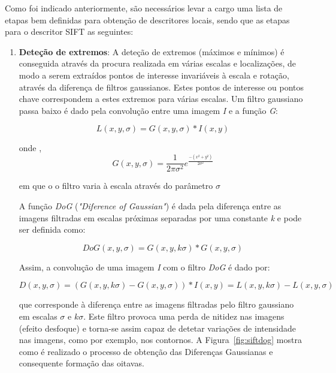 Como foi indicado anteriormente, são necessários levar a cargo uma lista de etapas bem definidas para obtenção de descritores locais, sendo que as etapas para o descritor SIFT as seguintes:

\begin{enumerate}
\item \textbf{Deteção de extremos}:  A deteção de extremos (máximos e mínimos) é conseguida através da procura realizada em várias escalas e localizações, de modo a serem extraídos pontos de interesse invariáveis à escala e rotação, através da diferença de filtros gaussianos. Estes pontos de interesse ou pontos chave correspondem a estes extremos para várias escalas. 
Um filtro gaussiano passa baixo é dado pela convolução entre uma imagem \textit{I} e a função \textit{G}:

\begin{equation}
L\left ( x, y, \sigma  \right ) = G\left ( x, y, \sigma  \right ) * I\left ( x, y \right )
\end{equation}

onde ,
\begin{equation}
G\left ( x, y, \sigma  \right ) = \frac{1}{2\pi \sigma^2} e^\frac{-\left ( x^2 + y^2 \right )}{2\sigma^2} 
\end{equation}

em que o o filtro varia à escala através do parâmetro $ \sigma $

A função \textit{DoG} (\textit{"Diference of Gaussian"}) é dada pela diferença entre as imagens filtradas em escalas próximas separadas por uma constante \textit{k} e pode ser definida como:

\begin{equation}
DoG\left ( x, y, \sigma  \right ) = G\left ( x, y, k\sigma  \right ) * G\left ( x, y, \sigma \right )
\end{equation}

Assim, a convolução de uma imagem \textit{I} com o filtro \textit{DoG} é dado por:

\begin{equation}
D\left ( x, y, \sigma  \right ) = \left (  G\left ( x, y, k\sigma  \right ) - G\left ( x, y, \sigma \right ) \right )* I\left ( x, y \right ) = L\left ( x, y, k\sigma  \right ) - L\left ( x, y, \sigma  \right )
\end{equation}

que corresponde à diferença entre as imagens filtradas pelo filtro gaussiano em escalas $ \sigma $ e $ k\sigma $. Este filtro provoca uma perda de nitidez nas imagens (efeito desfoque) e torna-se assim capaz de detetar variações de intensidade nas imagens, como por exemplo, nos contornos. A Figura~\ref{fig:siftdog} mostra como é realizado o processo de obtenção das Diferenças Gaussianas e consequente formação das oitavas. 


\end{enumerate}
